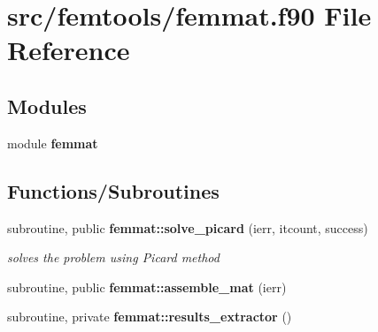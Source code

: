 \section{src/femtools/femmat.f90 File Reference}
\label{femmat_8f90}
\subsection*{Modules}
\begin{DoxyCompactItemize}
\item 
module {\bf femmat}
\end{DoxyCompactItemize}
\subsection*{Functions/\+Subroutines}
\begin{DoxyCompactItemize}
\item 
subroutine, public {\bf femmat\+::solve\+\_\+picard} (ierr, itcount, success)
\begin{DoxyCompactList}\small\item\em solves the problem using Picard method \end{DoxyCompactList}\item 
subroutine, public {\bf femmat\+::assemble\+\_\+mat} (ierr)
\item 
subroutine, private {\bf femmat\+::results\+\_\+extractor} ()
\end{DoxyCompactItemize}

